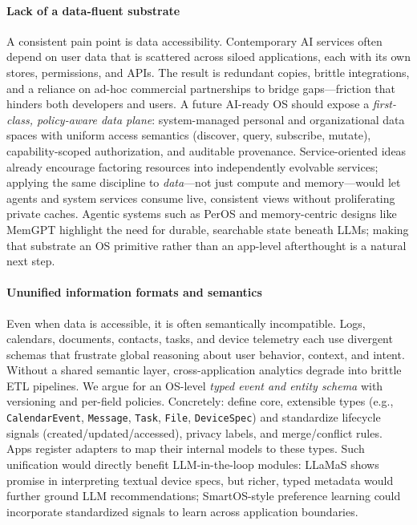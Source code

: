 \documentclass{article}
\begin{document}
\paragraph{Lack of a data-fluent substrate}
A consistent pain point is data accessibility. Contemporary AI services often depend on user data that is scattered across siloed applications, each with its own stores, permissions, and APIs. The result is redundant copies, brittle integrations, and a reliance on ad-hoc commercial partnerships to bridge gaps—friction that hinders both developers and users. A future AI-ready OS should expose a \emph{first-class, policy-aware data plane}: system-managed personal and organizational data spaces with uniform access semantics (discover, query, subscribe, mutate), capability-scoped authorization, and auditable provenance. Service-oriented ideas \cite{liu2021serviceos} already encourage factoring resources into independently evolvable services; applying the same discipline to \emph{data}—not just compute and memory—would let agents and system services consume live, consistent views without proliferating private caches. Agentic systems such as PerOS \cite{he2024peros} and memory-centric designs like MemGPT \cite{packer2023memgpt} highlight the need for durable, searchable state beneath LLMs; making that substrate an OS primitive rather than an app-level afterthought is a natural next step.

\paragraph{Ununified information formats and semantics}
Even when data is accessible, it is often semantically incompatible. Logs, calendars, documents, contacts, tasks, and device telemetry each use divergent schemas that frustrate global reasoning about user behavior, context, and intent. Without a shared semantic layer, cross-application analytics degrade into brittle ETL pipelines. We argue for an OS-level \emph{typed event and entity schema} with versioning and per-field policies. Concretely: define core, extensible types (e.g., \texttt{CalendarEvent}, \texttt{Message}, \texttt{Task}, \texttt{File}, \texttt{DeviceSpec}) and standardize lifecycle signals (created/updated/accessed), privacy labels, and merge/conflict rules. Apps register adapters to map their internal models to these types. Such unification would directly benefit LLM-in-the-loop modules: LLaMaS \cite{kamath2024llamas} shows promise in interpreting textual device specs, but richer, typed metadata would further ground LLM recommendations; SmartOS-style preference learning \cite{goodarzy2021smartos} could incorporate standardized signals to learn across application boundaries.
\end{document}
